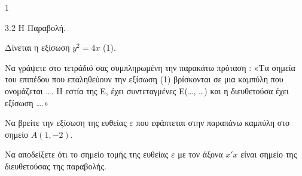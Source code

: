 \begin{ylh}{1}
    \item 3.2 Η Παραβολή.
\end{ylh}
Δίνεται η εξίσωση $y^2 = 4x$ (1).
\begin{alist}
\item Να γράψετε στο τετράδιό σας συμπληρωμένη την παρακάτω πρόταση :
«Τα σημεία του επιπέδου που επαληθεύουν την εξίσωση (1) βρίσκονται σε μια καμπύλη που ονομάζεται \dots. Η εστία της Ε, έχει συντεταγμένες Ε(\dots, \dots) και η διευθετούσα έχει εξίσωση \dots.» 
\item Να βρείτε την εξίσωση της ευθείας $\varepsilon$ που εφάπτεται στην παραπάνω καμπύλη στο σημείο $A(1, -2)$. 
\item Να αποδείξετε ότι το σημείο τομής της ευθείας $\varepsilon$ με τον άξονα $x'x$ είναι σημείο της διευθετούσας της παραβολής. 
\end{alist}